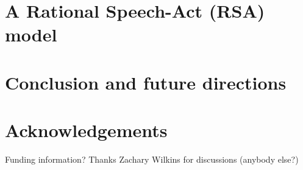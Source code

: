 \documentclass[10pt,letterpaper]{article}
\begin{document}
 
\section{A Rational Speech-Act (RSA) model}
\label{sec:RSA}


%

\section{Conclusion and future directions}
\label{sec:Conclusion}



\section{Acknowledgements}

Funding information? Thanks Zachary Wilkins for discussions 
 (anybody else?)





\setlength{\bibleftmargin}{.125in}
\setlength{\bibindent}{-\bibleftmargin}

\def\thebibliography#1{\section*{References}
 \small
 \list
 {[\arabic{enumi}]}{\leftmargin \parindent
   \itemindent -\parindent
   \itemsep 0ex plus 1pt
   \parsep 0.1ex plus 1pt minus 1pt
   \usecounter{enumi}}
   \def\newblock{\hskip .11em plus .33em minus .07em}
   \sloppy\clubpenalty4000\widowpenalty4000
   \sfcode`\.=1000\relax}

\end{document}
